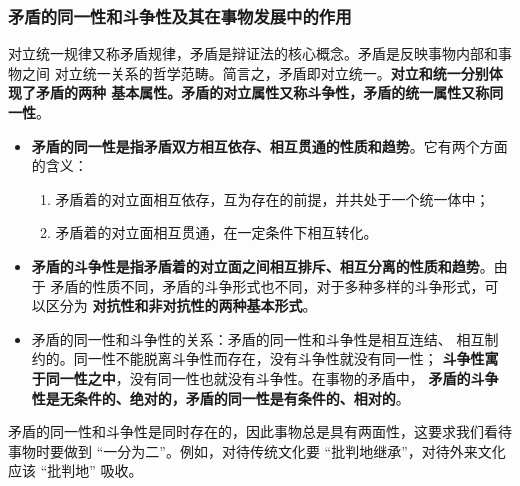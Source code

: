 \documentclass[utf-8, 10pt]{article}
\begin{document}
\subsubsection{矛盾的同一性和斗争性及其在事物发展中的作用}



对立统一规律又称矛盾规律，矛盾是辩证法的核心概念。矛盾是反映事物内部和事物之间
对立统一关系的哲学范畴。简言之，矛盾即对立统一。\textbf{对立和统一分别体现了矛盾的两种
基本属性。矛盾的对立属性又称斗争性，矛盾的统一属性又称同一性}。
\begin{itemize}[itemsep=0pt]
    \item \textbf{矛盾的同一性是指矛盾双方相互依存、相互贯通的性质和趋势}。它有两个方面
    的含义：
    \begin{enumerate}[label={${\arabic*}^\circ$}, itemsep=0pt]
        \item 矛盾着的对立面相互依存，互为存在的前提，并共处于一个统一体中；
        \item 矛盾着的对立面相互贯通，在一定条件下相互转化。
    \end{enumerate}
    \item \textbf{矛盾的斗争性是指矛盾着的对立面之间相互排斥、相互分离的性质和趋势}。由于
    矛盾的性质不同，矛盾的斗争形式也不同，对于多种多样的斗争形式，可以区分为
    \textbf{对抗性和非对抗性的两种基本形式}。
    \item 矛盾的同一性和斗争性的关系：矛盾的同一性和斗争性是相互连结、
    相互制约的。同一性不能脱离斗争性而存在，没有斗争性就没有同一性；
    \textbf{斗争性寓于同一性之中}，没有同一性也就没有斗争性。在事物的矛盾中，
    \textbf{矛盾的斗争性是无条件的、绝对的，矛盾的同一性是有条件的、相对的}。
\end{itemize}
矛盾的同一性和斗争性是同时存在的，因此事物总是具有两面性，这要求我们看待
事物时要做到 “一分为二”。例如，对待传统文化要 “批判地继承”，对待外来文化应该
“批判地” 吸收。
\end{document}
